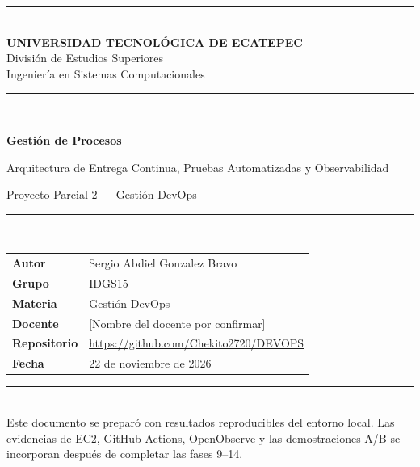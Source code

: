 \documentclass[12pt,a4paper]{article}
\renewcommand{\arraystretch}{1.18}
\newcommand{\repoURL}{https://github.com/Chekito2720/DEVOPS}
\begin{document}
\begin{titlepage}
  \centering
  \vspace*{0.5cm}
  {\color{uteqBlue}\rule{\textwidth}{1.2pt}}\\[0.8cm]
  {\Large\bfseries\color{uteqBlue} UNIVERSIDAD TECNOLÓGICA DE ECATEPEC}\\[0.25cm]
  {\large\color{uteqBlue}División de Estudios Superiores}\\[0.25cm]
  {\large\color{uteqBlue}Ingeniería en Sistemas Computacionales}\\[1.2cm]
  {\color{uteqBlue}\rule{\textwidth}{0.5pt}}\\[1.5cm]

  {\Huge\bfseries Gestión de Procesos\par}
  \vspace{0.4cm}
  {\Large Arquitectura de Entrega Continua, Pruebas Automatizadas y Observabilidad\par}
  \vspace{1.2cm}
  {\large Proyecto Parcial 2 --- Gestión DevOps\par}
  \vspace{2.2cm}

  \begin{minipage}{0.78\textwidth}
    \color{uteqBlue}\rule{\linewidth}{0.7pt}\\[0.6cm]
    \renewcommand{\arraystretch}{1.55}
    \begin{tabularx}{\linewidth}{>{\bfseries}l X}
      Autor & Sergio Abdiel Gonzalez Bravo \\
      Grupo & IDGS15 \\
      Materia & Gestión DevOps \\
      Docente & [Nombre del docente por confirmar] \\
      Repositorio & \url{\repoURL} \\
      Fecha & 22 de noviembre de 2026 \\
    \end{tabularx}
  \end{minipage}

  \vfill
  {\color{uteqBlue}\rule{\textwidth}{0.5pt}}\\[0.35cm]
  {\small Este documento se preparó con resultados reproducibles del entorno local. Las evidencias de EC2, GitHub Actions, OpenObserve y las demostraciones A/B se incorporan después de completar las fases 9--14.}
\end{titlepage}
\end{document}
